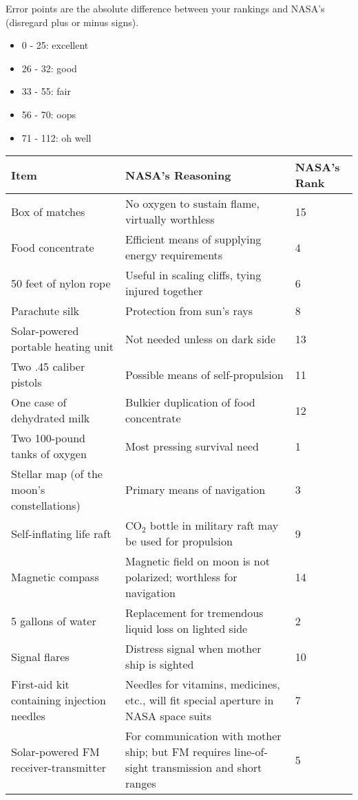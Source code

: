 \begin{solution}[0in]

Error points are the absolute difference between your rankings and
NASA's (disregard plus or minus signs).
\begin{itemize}
    \item 0 - 25: excellent
    \item 26 - 32: good
    \item 33 - 55: fair
    \item 56 - 70: oops
    \item 71 - 112: oh well
\end{itemize}

\clearpage

\begin{center}
    \begin{tabular}{|>{\raggedright}p{4cm}|p{8cm}|m{1.5cm}|}
        \hline
        Item & NASA's Reasoning & NASA's Rank \\ \hline
        Box of matches & No oxygen to sustain flame, virtually worthless &
        15 \\ \hline
        Food concentrate & Efficient means of supplying energy requirements
        & 4 \\ \hline
        50 feet of nylon rope & Useful in scaling cliffs, tying injured
        together & 6 \\ \hline
        Parachute silk & Protection from sun's rays & 8 \\ \hline
        Solar-powered portable heating unit & Not needed unless on dark
        side & 13 \\ \hline
        Two .45 caliber pistols & Possible means of self-propulsion & 11 \\
        \hline
        One case of dehydrated milk & Bulkier duplication of food concentrate &
        12 \\ \hline
        Two 100-pound tanks of oxygen & Most pressing survival need & 1 \\
        \hline
        Stellar map (of the moon's constellations)  & Primary means of
        navigation & 3 \\ \hline
        Self-inflating life raft & $\text{CO}_2$ bottle in military raft may be used
        for propulsion & 9 \\ \hline
        Magnetic compass & Magnetic field on moon is not polarized;
        worthless for navigation & 14 \\ \hline
        5 gallons of water & Replacement for tremendous liquid loss on
        lighted side & 2 \\ \hline
        Signal flares & Distress signal when mother ship is sighted & 10 \\
        \hline
        First-aid kit containing injection needles & Needles for vitamins, medicines,
        etc., will fit special aperture in NASA space suits & 7 \\ \hline
        Solar-powered FM receiver-transmitter & For communication with
        mother ship; but FM requires line-of-sight transmission and short
        ranges & 5 \\ \hline
    \end{tabular}
\end{center}

\end{solution}
